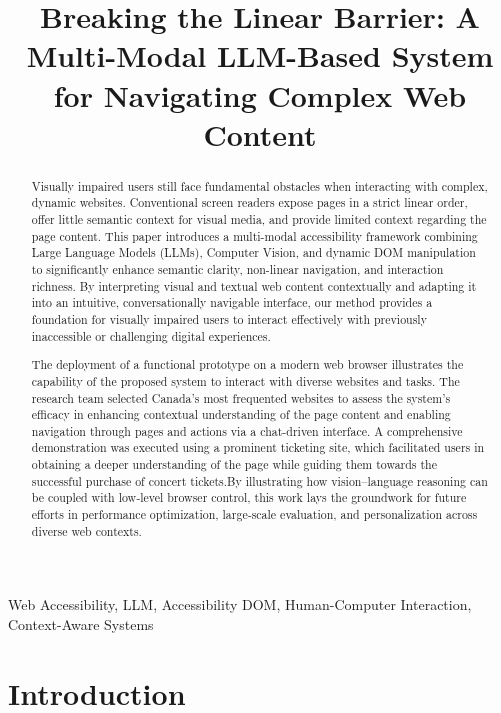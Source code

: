 \documentclass[conference]{IEEEtran}
\begin{document}
\renewcommand{\figurename}{Figure}


\title{Breaking the Linear Barrier: A Multi-Modal LLM-Based System for Navigating Complex Web Content}



\maketitle

\begin{abstract}
Visually impaired users still face fundamental obstacles when interacting with complex, dynamic websites. Conventional screen readers expose pages in a strict linear order, offer little semantic context for visual media, and provide limited context regarding the page content. This paper introduces a multi-modal accessibility framework combining Large Language Models (LLMs), Computer Vision, and dynamic DOM manipulation to significantly enhance semantic clarity, non-linear navigation, and interaction richness. By interpreting visual and textual web content contextually and adapting it into an intuitive, conversationally navigable interface, our method provides a foundation for visually impaired users to interact effectively with previously inaccessible or challenging digital experiences.

The deployment of a functional prototype on a modern web browser illustrates the capability of the proposed system to interact with diverse websites and tasks. The research team selected Canada's most frequented websites to assess the system's efficacy in enhancing contextual understanding of the page content and enabling navigation through pages and actions via a chat-driven interface. A comprehensive demonstration was executed using a prominent ticketing site, which facilitated users in obtaining a deeper understanding of the page while guiding them towards the successful purchase of concert tickets.By illustrating how vision–language reasoning can be coupled with low‑level browser control, this work lays the groundwork for future efforts in performance optimization, large‑scale evaluation, and personalization across diverse web contexts.
\end{abstract}

\begin{IEEEkeywords}
Web Accessibility, LLM, Accessibility DOM, Human-Computer Interaction, Context-Aware Systems
\end{IEEEkeywords}

\section{Introduction}\label{intro}
\end{document}
